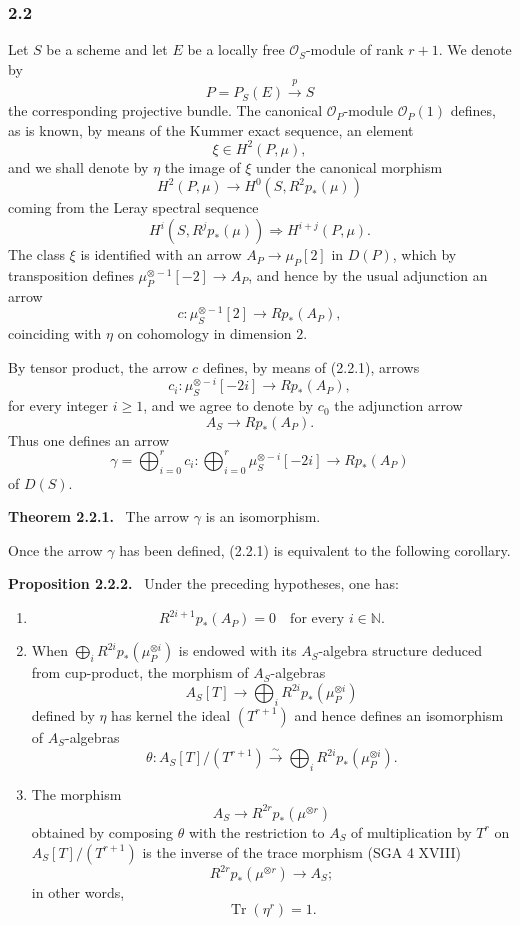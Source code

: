 \documentclass[11pt]{article}
\newenvironment{statement}[1]{\par\medskip\noindent\textbf{#1.}\ }{\par\medskip}
\begin{document}
\subsubsection*{2.2}
Let $S$ be a scheme and let $E$ be a locally free $\mathcal O_S$-module of rank $r+1$. We denote by
\[
P=P_S(E)\xrightarrow{p}S
\]
the corresponding projective bundle. The canonical $\mathcal O_P$-module $\mathcal O_P(1)$ defines, as is known, by means of the Kummer exact sequence, an element
\[
\xi\in H^2(P,\mu),
\]
and we shall denote by $\eta$ the image of $\xi$ under the canonical morphism
\[
H^2(P,\mu)\longrightarrow H^0(S,R^2p_*(\mu))
\]
coming from the Leray spectral sequence
\[
H^i(S,R^jp_*(\mu))\Rightarrow H^{i+j}(P,\mu).
\]
The class $\xi$ is identified with an arrow $A_P\to\mu_P[2]$ in $D(P)$, which by transposition defines $\mu_P^{\otimes -1}[-2]\to A_P$, and hence by the usual adjunction an arrow
\[
c:\mu_S^{\otimes -1}[2]\longrightarrow Rp_*(A_P),
\]
coinciding with $\eta$ on cohomology in dimension $2$.

By tensor product, the arrow $c$ defines, by means of (2.2.1), arrows
\[
c_i:\mu_S^{\otimes -i}[-2i]\longrightarrow Rp_*(A_P),
\]
for every integer $i\ge1$, and we agree to denote by $c_0$ the adjunction arrow
\[
A_S\longrightarrow Rp_*(A_P).
\]
Thus one defines an arrow
\[
\gamma=\bigoplus_{i=0}^{r}c_i:
\bigoplus_{i=0}^{r}\mu_S^{\otimes -i}[-2i]\longrightarrow Rp_*(A_P)
\]
of $D(S)$.

\begin{statement}{Theorem 2.2.1}
The arrow $\gamma$ is an isomorphism.
\end{statement}

Once the arrow $\gamma$ has been defined, (2.2.1) is equivalent to the following corollary.

\begin{statement}{Proposition 2.2.2}
Under the preceding hypotheses, one has:
\begin{enumerate}[label=\alph*)]
\item
\[
R^{2i+1}p_*(A_P)=0\quad\text{for every }i\in\mathbb N.
\]
\item When $\bigoplus_i R^{2i}p_*(\mu_P^{\otimes i})$ is endowed with its $A_S$-algebra structure deduced from cup-product, the morphism of $A_S$-algebras
\[
A_S[T]\longrightarrow \bigoplus_i R^{2i}p_*(\mu_P^{\otimes i})
\]
defined by $\eta$ has kernel the ideal $(T^{r+1})$ and hence defines an isomorphism of $A_S$-algebras
\[
\theta:A_S[T]/(T^{r+1})\xrightarrow{\sim}\bigoplus_i R^{2i}p_*(\mu_P^{\otimes i}).
\]
\item The morphism
\[
A_S\longrightarrow R^{2r}p_*(\mu^{\otimes r})
\]
obtained by composing $\theta$ with the restriction to $A_S$ of multiplication by $T^r$ on $A_S[T]/(T^{r+1})$ is the inverse of the trace morphism (SGA 4 XVIII)
\[
R^{2r}p_*(\mu^{\otimes r})\longrightarrow A_S;
\]
in other words,
\[
\operatorname{Tr}(\eta^r)=1.
\]
\end{enumerate}
\end{statement}
\end{document}
